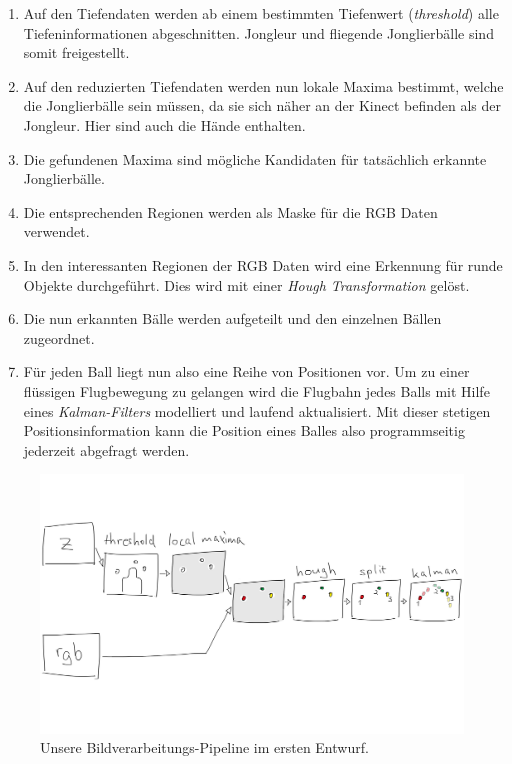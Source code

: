 \documentclass[12pt,a4paper,ngerman]{scrartcl}
\begin{document}
\begin{enumerate}
\item Auf den Tiefendaten werden ab einem bestimmten Tiefenwert (\textit{threshold}) 
	alle Tiefeninformationen abgeschnitten. Jongleur und fliegende Jonglierbälle sind
	somit freigestellt.
\item Auf den reduzierten Tiefendaten werden nun lokale Maxima bestimmt, welche die 
	Jonglierbälle sein müssen, da sie sich näher an der Kinect befinden als der 
	Jongleur. Hier sind auch die Hände enthalten.
\item Die gefundenen Maxima sind mögliche Kandidaten für tatsächlich erkannte 
	Jonglierbälle. 
\item Die entsprechenden Regionen werden als Maske für die RGB Daten verwendet.
\item In den interessanten Regionen der RGB Daten wird eine Erkennung für runde 
	Objekte durchgeführt. Dies wird mit einer \textit{Hough Transformation} gelöst.
\item Die nun erkannten Bälle werden aufgeteilt und den einzelnen Bällen zugeordnet.
\item Für jeden Ball liegt nun also eine Reihe von Positionen vor. Um zu einer 
	flüssigen Flugbewegung zu gelangen wird die Flugbahn jedes Balls mit Hilfe eines
	\textit{Kalman-Filters} modelliert und laufend aktualisiert. Mit dieser stetigen
	Positionsinformation kann die Position eines Balles also programmseitig jederzeit 
	abgefragt werden.
\end{enumerate}

\begin{figure}[H]
    \centering
    \includegraphics[scale=0.14]{img/processing-pipeline.png}
    \caption{Unsere Bildverarbeitungs-Pipeline im ersten Entwurf.}
    \label{ourpipeline}
\end{figure}
\end{document}
